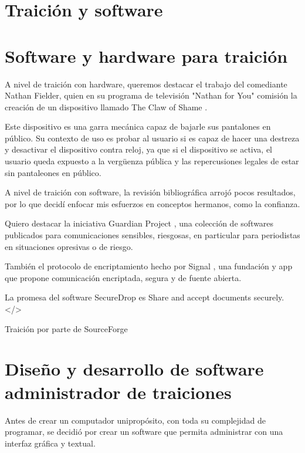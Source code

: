 \documentclass{article}
\begin{document}
\section{Traición y software}

\clearpage

\section{Software y hardware para traición}

A nivel de traición con hardware, queremos destacar el trabajo del comediante Nathan Fielder, quien en su programa de televisión "Nathan for You" comisión la creación de un dispositivo llamado The Claw of Shame \cite{clawOfShame}.

Este dispositivo es una garra mecánica capaz de bajarle sus pantalones en público. Su contexto de uso es probar al usuario si es capaz de hacer una destreza y desactivar el dispositivo contra reloj, ya que si el dispositivo se activa, el usuario queda expuesto a la vergüenza pública y las repercusiones legales de estar sin pantaleones en público.

A nivel de traición con software, la revisión bibliográfica arrojó pocos resultados, por lo que decidí enfocar mis esfuerzos en conceptos hermanos, como la confianza.

Quiero destacar la iniciativa Guardian Project \cite{guardianProject}, una colección de softwares publicados para comunicaciones sensibles, riesgosas, en particular para periodistas en situaciones opresivas o de riesgo.

También el protocolo de encriptamiento hecho por Signal \cite{signal}, una fundación y app que propone comunicación encriptada, segura y de fuente abierta.



La promesa del software SecureDrop es Share and accept documents securely. </>

Traición por parte de SourceForge \cite{sourceForgeWiki} \cite{sourceForgeArs}

\clearpage

\section{Diseño y desarrollo de software administrador de traiciones}

Antes de crear un computador unipropósito, con toda su complejidad de programar, se decidió por crear un software que permita administrar con una interfaz gráfica y textual.
\end{document}

